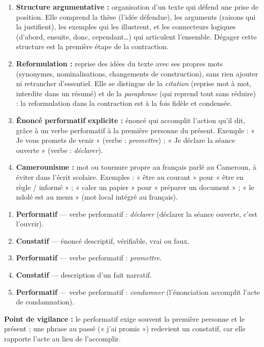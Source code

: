 \documentclass[11pt]{article}
\newcommand{\cle}[1]{{\popxbold\color{popdark}#1}}
\begin{document}
\begin{corrige}
\begin{enumerate}
    \item \textbf{Structure argumentative :} organisation d'un texte qui défend une prise de position. Elle comprend la \cle{thèse} (l'idée défendue), les \cle{arguments} (raisons qui la justifient), les exemples qui les illustrent, et les \cle{connecteurs logiques} (d'abord, ensuite, donc, cependant\ldots) qui articulent l'ensemble. Dégager cette structure est la première étape de la contraction.
    \item \textbf{Reformulation :} reprise des idées du texte avec ses propres mots (synonymes, nominalisations, changements de construction), sans rien ajouter ni retrancher d'essentiel. Elle se distingue de la \emph{citation} (reprise mot à mot, interdite dans un résumé) et de la \emph{paraphrase} (qui reprend tout sans réduire) : la reformulation dans la contraction est à la fois fidèle et condensée.
    \item \textbf{Énoncé performatif explicite :} énoncé qui accomplit l'action qu'il dit, grâce à un verbe performatif à la première personne du présent. Exemple : « Je vous promets de venir » (verbe : \emph{promettre}) ; « Je déclare la séance ouverte » (verbe : \emph{déclarer}).
    \item \textbf{Camerounisme :} mot ou tournure propre au français parlé au Cameroun, à éviter dans l'écrit scolaire. Exemples : « être au courant » pour « être en règle / informé » ; « caler un papier » pour « préparer un document » ; « le ndolé est au menu » (mot local intégré au français).
\end{enumerate}
\end{corrige}

\begin{corrige}
\begin{enumerate}
    \item \textbf{Performatif} — verbe performatif : \emph{déclarer} (déclarer la séance ouverte, c'est l'ouvrir).
    \item \textbf{Constatif} — énoncé descriptif, vérifiable, vrai ou faux.
    \item \textbf{Performatif} — verbe performatif : \emph{promettre}.
    \item \textbf{Constatif} — description d'un fait narratif.
    \item \textbf{Performatif} — verbe performatif : \emph{condamner} (l'énonciation accomplit l'acte de condamnation).
\end{enumerate}
\textbf{Point de vigilance :} le performatif exige souvent la première personne et le présent ; une phrase au passé (« j'ai promis ») redevient un constatif, car elle rapporte l'acte au lieu de l'accomplir.
\end{corrige}
\end{document}
